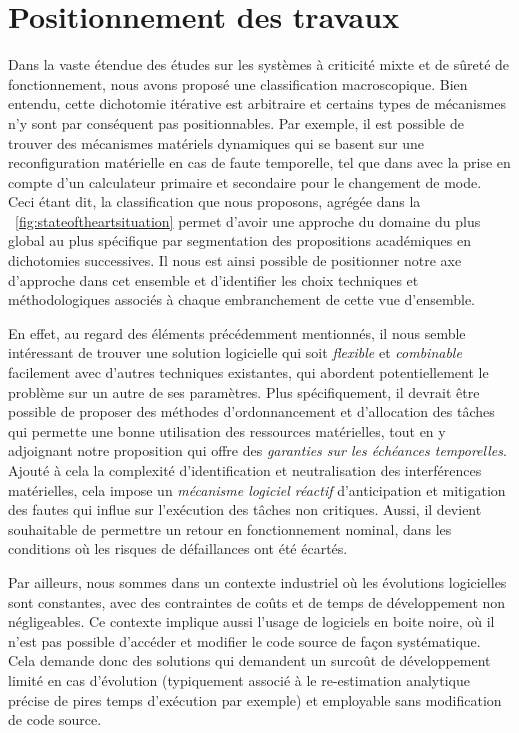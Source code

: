 \documentclass[french, a4paper, 11pt, twoside, pdftex]{StyleThese}
\begin{document}
   \section{Positionnement des travaux}
   
   Dans la vaste étendue des études sur les systèmes à criticité mixte et de sûreté de fonctionnement, nous avons proposé une classification macroscopique. Bien entendu, cette dichotomie itérative est arbitraire et certains types de mécanismes n'y sont par conséquent pas positionnables. Par exemple, il est possible de trouver des mécanismes matériels dynamiques qui se basent sur une reconfiguration matérielle en cas de faute temporelle, tel que dans \cite{lin_scheduling_2015} avec la prise en compte d'un calculateur primaire et secondaire pour le changement de mode. Ceci étant dit, la classification que nous proposons, agrégée dans la ~\autoref{fig:stateoftheartsituation} permet d'avoir une approche du domaine du plus global au plus spécifique par segmentation des propositions académiques en dichotomies successives. Il nous est ainsi possible de positionner notre axe d'approche dans cet ensemble et d'identifier les choix techniques et méthodologiques associés à chaque embranchement de cette vue d'ensemble.
   
   En effet, au regard des éléments précédemment mentionnés, il nous semble intéressant de trouver une solution logicielle qui soit \textit{flexible} et \textit{combinable} facilement avec d'autres techniques existantes, qui abordent potentiellement le problème sur un autre de ses paramètres. Plus spécifiquement, il devrait être possible de proposer des méthodes d'ordonnancement et d'allocation des tâches qui permette une bonne utilisation des ressources matérielles, tout en y adjoignant notre proposition qui offre des \textit{garanties sur les échéances temporelles}. Ajouté à cela la complexité d'identification et neutralisation des interférences matérielles, cela impose un \textit{mécanisme logiciel réactif} d'anticipation et mitigation des fautes qui influe sur l'exécution des tâches non critiques. 
   Aussi, il devient souhaitable de permettre un retour en fonctionnement nominal, dans les conditions où les risques de défaillances ont été écartés. 
   
   Par ailleurs, nous sommes dans un contexte industriel où les évolutions logicielles sont constantes, avec des contraintes de coûts et de temps de développement non négligeables. Ce contexte implique aussi l'usage de logiciels en boite noire, où il n'est pas possible d'accéder et modifier le code source de façon systématique. Cela demande donc des solutions qui demandent un surcoût de développement limité en cas d'évolution (typiquement associé à le re-estimation analytique précise de pires temps d'exécution par exemple) et employable sans modification de code source.
   
\end{document}
